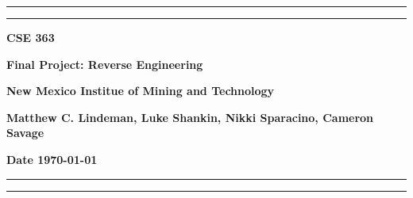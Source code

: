 \documentclass{report}
\begin{document}
\begin{titlepage}
    \begin{center}
        \vspace{0.25cm}
        \hrule
        \vspace{0.1cm}
        \hrule
        \vspace{0.25cm}
        {\LARGE{\textbf{CSE 363}}}
        \par
        \vspace{0.25cm}
        {\large{\textbf{Final Project: Reverse Engineering}}}
        \par
        \vspace{0.25cm}
        {\large{\textbf{New Mexico Institue of Mining and Technology}}}
        \par
        \vspace{0.25cm}
        \textbf{Matthew C. Lindeman, Luke Shankin, Nikki Sparacino, Cameron
        Savage}
        \par
        \vspace{0.25cm}
        {\large{\textbf{Date \today}}}
        \vspace{0.25cm}
        \hrule
        \vspace{0.1cm}
        \hrule
        \vfill
    \end{center}
\end{titlepage}
\end{document}

